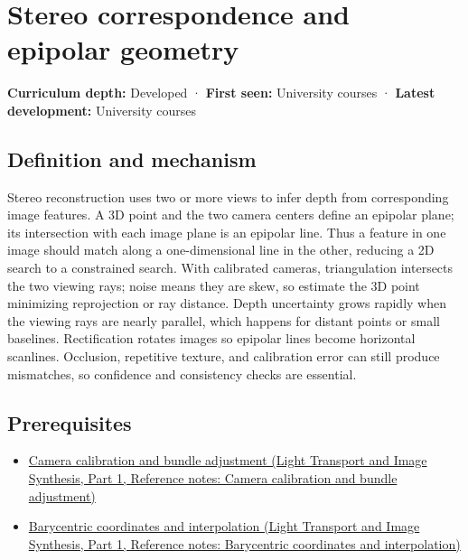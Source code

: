 \hypertarget{appendix-c4e98b6e4001}{}\label{referencestart:appendix-c4e98b6e4001}
\section{Stereo correspondence and epipolar geometry}\label{appendix-c4e98b6e4001-stereo-correspondence-and-epipolar-geometry}

\hypertarget{appendix-c4e98b6e4001-stereo-correspondence-and-epipolar-geometry}{}

\textbf{Curriculum depth:} Developed · \textbf{First seen:} University courses · \textbf{Latest development:} University courses

\begin{allmightroledefinition}

\subsection{Definition and mechanism}\label{appendix-c4e98b6e4001-definition-and-mechanism}

\hypertarget{appendix-c4e98b6e4001-definition-and-mechanism}{}

Stereo reconstruction uses two or more views to infer depth from corresponding image features. A 3D point and the two camera centers define an epipolar plane; its intersection with each image plane is an epipolar line. Thus a feature in one image should match along a one-dimensional line in the other, reducing a 2D search to a constrained search. With calibrated cameras, triangulation intersects the two viewing rays; noise means they are skew, so estimate the 3D point minimizing reprojection or ray distance. Depth uncertainty grows rapidly when the viewing rays are nearly parallel, which happens for distant points or small baselines. Rectification rotates images so epipolar lines become horizontal scanlines. Occlusion, repetitive texture, and calibration error can still produce mismatches, so confidence and consistency checks are essential.

\end{allmightroledefinition}

\subsection{Prerequisites}\label{appendix-c4e98b6e4001-prerequisites}

\hypertarget{appendix-c4e98b6e4001-prerequisites}{}

\begin{itemize}
\tightlist
\item
  \href{../04-Light-Transport-and-Image-Synthesis-P01/main.pdf\#appendix-3ee9861904d5}{Camera calibration and bundle adjustment (Light Transport and Image Synthesis, Part 1, Reference notes: Camera calibration and bundle adjustment)}
\item
  \href{../04-Light-Transport-and-Image-Synthesis-P01/main.pdf\#appendix-02b9d9a81dca}{Barycentric coordinates and interpolation (Light Transport and Image Synthesis, Part 1, Reference notes: Barycentric coordinates and interpolation)}
\end{itemize}


